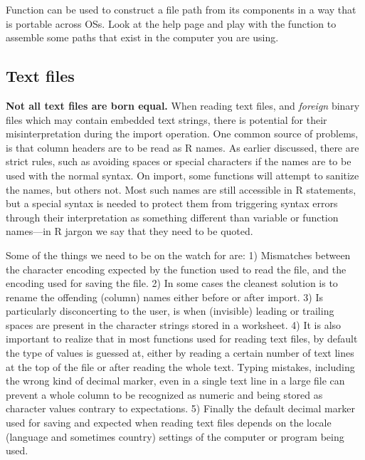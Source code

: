 \documentclass[krantz2,ChapterTOCs]{krantz}\usepackage{knitr}
\begin{document}
\begin{playground}
Function  can be used to construct a file path from its components in a way that is portable across OSs. Look at the help page and play with the function to assemble some paths that exist in the computer you are using.
\end{playground}

\subsection{Text files}\label{sec:files:txt}

\begin{warningbox}
\textbf{Not all text files are born equal.} When reading text files, and \emph{foreign} binary files which may contain embedded text strings, there is potential for their misinterpretation during the import operation. One common source of problems, is that column headers are to be read as R names. As earlier discussed, there are strict rules, such as avoiding spaces or special characters if the names are to be used with the normal syntax. On import, some functions will attempt to sanitize the names, but others not. Most such names are still accessible in R statements, but a special syntax is needed to protect them from triggering syntax errors through their interpretation as something different than variable or function names---in R jargon we say that they need to be quoted.

Some of the things we need to be on the watch for are:
1) Mismatches between the character encoding expected by the function used to read the file, and the encoding used for saving the file.
2) In some cases the cleanest solution is to rename the offending (column) names either before or after import.
3) Is particularly disconcerting to the user, is when (invisible) leading or trailing spaces are present in the character strings stored in a worksheet.
4) It is also important to realize that in most functions used for reading text files, by default the type of values is guessed at, either by reading a certain number of text lines at the top of the file or after reading the whole text. Typing mistakes, including the wrong kind of decimal marker, even in a single text line in a large file can prevent a whole column to be recognized as numeric and being stored as character values contrary to expectations.
5) Finally the default decimal marker used for saving and expected when reading text files depends on the locale (language and sometimes country) settings of the computer or program being used.


\end{warningbox}
\end{document}
